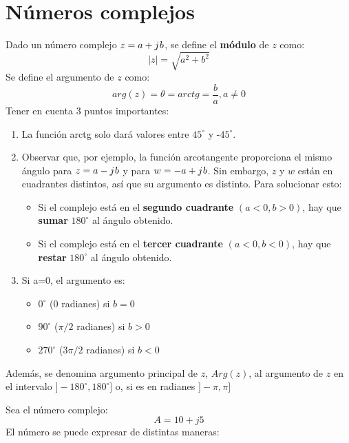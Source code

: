 \documentclass[
	12pt, %
	fleqn, %
	a4paper, %
]{LegrandOrangeBook}
\begin{document}
\chapter{Números complejos}
\begin{definition}
Dado un número complejo $z=a+{j\mkern1mu} b$, se define el \textbf{módulo} de $z$ como:
\begin{equation}
|z|=\sqrt{a^2+b^2}
\end{equation}
Se define el argumento de $z$ como:
\begin{equation}
arg(z)=\theta=arctg=\frac{b}{a}, a\neq 0
\end{equation}
Tener en cuenta 3 puntos importantes:
\begin{enumerate}
\item La función arctg solo dará valores entre $45^{\circ}$ y -$45^{\circ}$.
\item Observar que, por ejemplo, la función arcotangente proporciona el mismo ángulo para $z=a-{j\mkern1mu} b$ y para $w=-a+{j\mkern1mu} b$. Sin embargo, $z$ y $w$ están en cuadrantes distintos, así que su argumento es distinto. Para solucionar esto:
\begin{itemize}
\item Si el complejo está en el \textbf{segundo cuadrante} $(a<0, b>0)$, hay que \textbf{sumar} $180^{\circ}$ al ángulo obtenido.
\item Si el complejo está en el \textbf{tercer cuadrante} $(a<0, b<0)$, hay que \textbf{restar} $180^{\circ}$ al ángulo obtenido.
\end{itemize}
\item Si a=0, el argumento es:
\begin{itemize}
\item $0^{\circ}$ (0 radianes) si $b=0$
\item $90^{\circ}$ ($\pi/2$ radianes) si $b>0$
\item $270^{\circ}$ ($3\pi/2$ radianes) si $b<0$
\end{itemize}
\end{enumerate}
Además, se denomina argumento principal de $z$, $Arg(z)$, al argumento de $z$ en el intervalo $]-180^{\circ},180^{\circ}]$ o, si es en radianes $]-\pi,\pi]$
\end{definition}
Sea el número complejo:
\begin{equation}
\label{art:numeroscomplejos}
A=10 + j5
\end{equation}
El número se puede expresar de distintas maneras:
\end{document}
